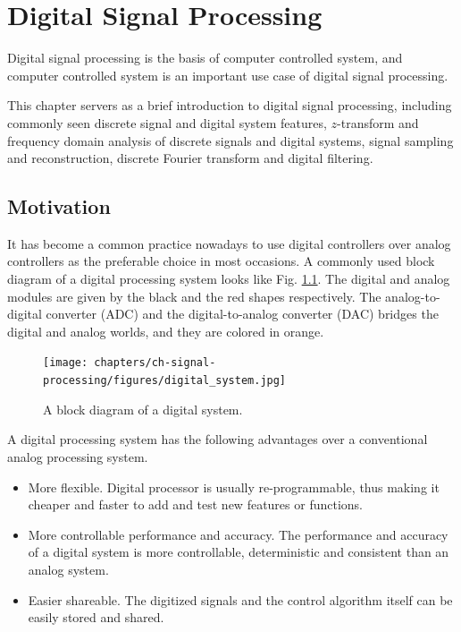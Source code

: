 \chapter{Digital Signal Processing}

Digital signal processing is the basis of computer controlled system, and computer controlled system is an important use case of digital signal processing.

This chapter servers as a brief introduction to digital signal processing, including commonly seen discrete signal and digital system features, $z$-transform and frequency domain analysis of discrete signals and digital systems, signal sampling and reconstruction, discrete Fourier transform and digital filtering.

\section{Motivation}

It has become a common practice nowadays to use digital controllers over analog controllers as the preferable choice in most occasions. A commonly used block diagram of a digital processing system looks like Fig. \ref{fig:digital_system}. The digital and analog modules are given by the black and the red shapes respectively. The analog-to-digital converter (ADC) and the digital-to-analog converter (DAC) bridges the digital and analog worlds, and they are colored in orange.
\begin{figure}
	\centering
	\texttt{[image: chapters/ch-signal-processing/figures/digital\_system.jpg]}
	\caption{A block diagram of a digital system.} \label{fig:digital_system}
\end{figure}

A digital processing system has the following advantages over a conventional analog processing system.
\begin{itemize}
	\item More flexible. Digital processor is usually re-programmable, thus making it cheaper and faster to add and test new features or functions.
	\item More controllable performance and accuracy. The performance and accuracy of a digital system is more controllable, deterministic and consistent than an analog system.
	\item Easier shareable. The digitized signals and the control algorithm itself can be easily stored and shared. 
\end{itemize}


